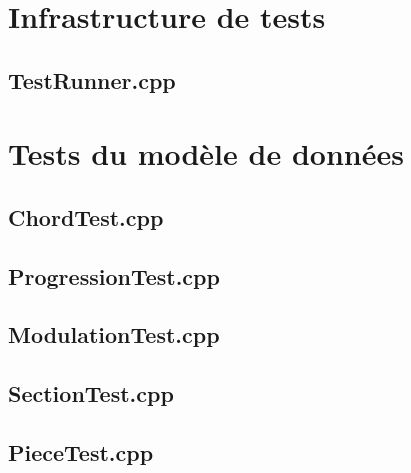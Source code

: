 \section{Infrastructure de tests}

\subsection{TestRunner.cpp}


\newpage
\section{Tests du modèle de données}

\subsection{ChordTest.cpp}


\subsection{ProgressionTest.cpp}


\subsection{ModulationTest.cpp}


\subsection{SectionTest.cpp}


\subsection{PieceTest.cpp}


